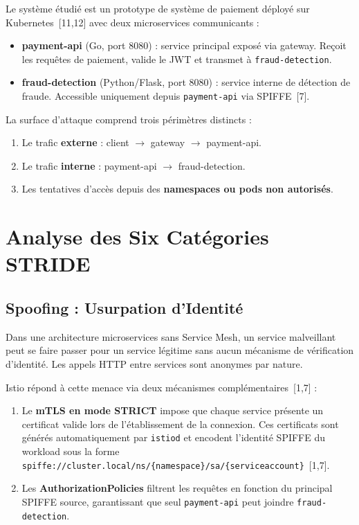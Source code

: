 Le système étudié est un prototype de système de paiement déployé sur
Kubernetes~[11,12] avec deux microservices communicants :

\begin{itemize}[topsep=4pt, itemsep=3pt]
  \item \textbf{payment-api} (Go, port 8080) : service principal exposé via
    gateway. Reçoit les requêtes de paiement, valide le JWT et transmet à
    \texttt{fraud-detection}.

  \item \textbf{fraud-detection} (Python/Flask, port 8080) : service interne de
    détection de fraude. Accessible uniquement depuis \texttt{payment-api} via
    SPIFFE~[7].
\end{itemize}

La surface d'attaque comprend trois périmètres distincts :

\begin{enumerate}[topsep=4pt, itemsep=3pt]
  \item Le trafic \textbf{externe} : client $\rightarrow$ gateway $\rightarrow$
    payment-api.
  \item Le trafic \textbf{interne} : payment-api $\rightarrow$ fraud-detection.
  \item Les tentatives d'accès depuis des \textbf{namespaces ou pods non
    autorisés}.
\end{enumerate}

\section{Analyse des Six Catégories STRIDE}

\subsection{Spoofing : Usurpation d'Identité}

Dans une architecture microservices sans Service Mesh, un service malveillant
peut se faire passer pour un service légitime sans aucun mécanisme de vérification
d'identité. Les appels HTTP entre services sont anonymes par nature.

Istio répond à cette menace via deux mécanismes complémentaires~[1,7] :

\begin{enumerate}[topsep=4pt, itemsep=3pt]
  \item Le \textbf{mTLS en mode STRICT} impose que chaque service présente un
    certificat valide lors de l'établissement de la connexion. Ces certificats
    sont générés automatiquement par \texttt{istiod} et encodent l'identité
    SPIFFE du workload sous la forme
    \texttt{spiffe://cluster.local/ns/\{namespace\}/sa/\{serviceaccount\}}~[1,7].

  \item Les \textbf{AuthorizationPolicies} filtrent les requêtes en fonction du
    principal SPIFFE source, garantissant que seul \texttt{payment-api} peut
    joindre \texttt{fraud-detection}.
\end{enumerate}

